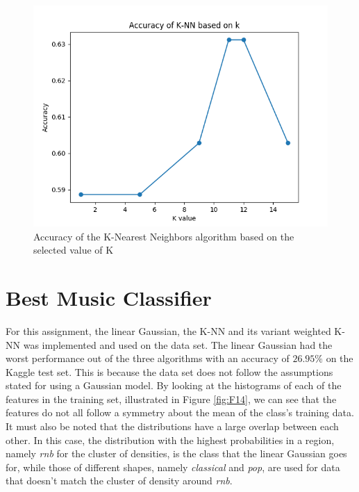 \documentclass[11pt]{scrartcl}
\begin{document}
\begin{figure}[ht]
\centering	
\includegraphics[scale=0.75]{Figure_1.png}	
\caption{Accuracy of the K-Nearest Neighbors algorithm based on the selected value of K}
\label{fig:F1}
\end{figure}

\section{Best Music Classifier}

For this assignment, the linear Gaussian, the K-NN and its variant weighted K-NN was implemented and used on the data set. The linear Gaussian had the worst performance out of the three algorithms with an accuracy of $26.95\%$ on the Kaggle test set. This is because the data set does not follow the assumptions stated for using a Gaussian model. By looking at the histograms of each of the features in the training set, illustrated in Figure \ref{fig:F14}, we can see that the features do not all follow a symmetry about the mean of the class's training data. It must also be noted that the distributions have a large overlap between each other. In this case, the distribution with the highest probabilities in a region, namely \textit{rnb} for the cluster of densities, is the class that the linear Gaussian goes for, while those of different shapes, namely \textit{classical} and \textit{pop}, are used for data that doesn't match the cluster of density around \textit{rnb}.  
\end{document}
